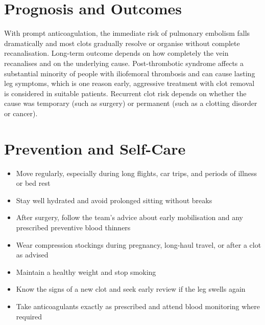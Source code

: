 \section*{Prognosis and Outcomes}
With prompt anticoagulation, the immediate risk of pulmonary embolism falls dramatically and most clots gradually resolve or organise without complete recanalisation. Long-term outcome depends on how completely the vein recanalises and on the underlying cause. Post-thrombotic syndrome affects a substantial minority of people with iliofemoral thrombosis and can cause lasting leg symptoms, which is one reason early, aggressive treatment with clot removal is considered in suitable patients. Recurrent clot risk depends on whether the cause was temporary (such as surgery) or permanent (such as a clotting disorder or cancer).

\section*{Prevention and Self-Care}
\begin{itemize}
    \item Move regularly, especially during long flights, car trips, and periods of illness or bed rest
    \item Stay well hydrated and avoid prolonged sitting without breaks
    \item After surgery, follow the team's advice about early mobilisation and any prescribed preventive blood thinners
    \item Wear compression stockings during pregnancy, long-haul travel, or after a clot as advised
    \item Maintain a healthy weight and stop smoking
    \item Know the signs of a new clot and seek early review if the leg swells again
    \item Take anticoagulants exactly as prescribed and attend blood monitoring where required
\end{itemize}

